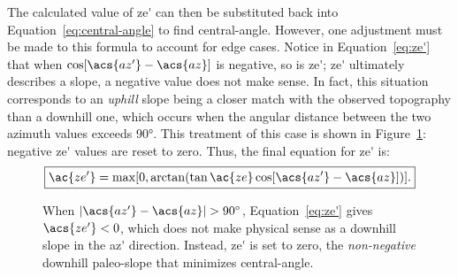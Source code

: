 The calculated value of \acs{ze'} can then be substituted back into Equation~\eqref{eq:central-angle} to find \acs{central-angle}. However, one adjustment must be made to this formula to account for edge cases. Notice in Equation~\eqref{eq:ze'} that when $\cos[\acs{az'}-\acs{az}]$ is negative, so is \acs{ze'}; \acs{ze'} ultimately describes a slope, a negative value does not make sense. In fact, this situation corresponds to an \emph{uphill} slope being a closer match with the observed topography than a downhill one, which occurs when the angular distance between the two azimuth values exceeds \ang{90}. This treatment of this case is shown in Figure~\ref{fig:reversal}: negative \acs{ze'} values are reset to zero. Thus, the final equation for \acs{ze'} is:
\begin{equation}
    \boxed{\ac{ze'}
    =\max[0,\arctan(\tan\ac{ze}
    \cos[\acs{az'}-\acs{az}])].}
    \label{eq:robust-ze'}
\end{equation}

\begin{figure}
    {\caption[``Reversal'' case: $|\acs{az'}-\acs{az}|>\ang{90}$]{When $|\acs{az'}-\acs{az}|>\ang{90}$, Equation~\eqref{eq:ze'} gives $\acs{ze'}<0$, which does not make physical sense as a downhill slope in the \acs{az'} direction. Instead, \acs{ze'} is set to zero, the \emph{non-negative} downhill paleo-slope that minimizes \acs{central-angle}.}\label{fig:reversal}}
    {}
\end{figure}

